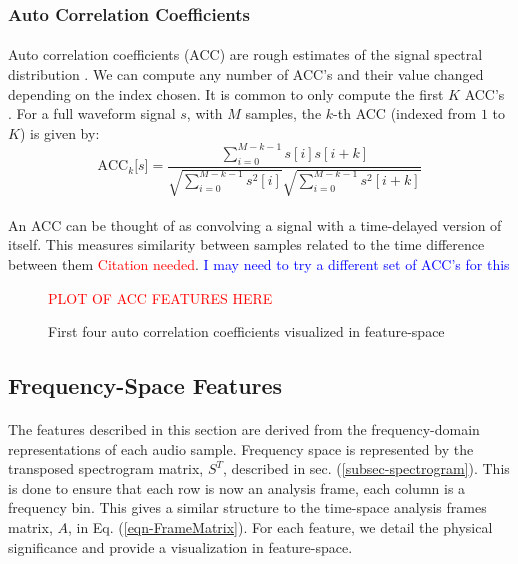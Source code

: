 \documentclass[12pt,letterpaper]{article}
\begin{document}
\subsubsection{Auto Correlation Coefficients}

\paragraph*{}Auto correlation coefficients (ACC) are rough estimates of the signal spectral distribution . We can compute any number of ACC's and their value changed depending on the index chosen. It is common to only compute the first $K$ ACC's \cite{Serizel}. For a full waveform signal $s$, with $M$ samples, the $k$-th ACC (indexed from $1$ to $K$) is given by:
\begin{equation}
\label{eqn-FeatureACC}
\text{ACC}_k\big[ s \big] = 
\frac{\sum_{i=0}^{M-k-1}s[i]s[i+k]} {\sqrt{\sum_{i=0}^{M-k-1}s^2[i]} \sqrt{\sum_{i=0}^{M-k-1}s^2[i+k]}}
\end{equation}

\paragraph*{}An ACC can be thought of as convolving a signal with a time-delayed version of itself. This measures similarity between samples related to the time difference between them \textcolor{red}{Citation needed}. \textcolor{blue}{I may need to try a different set of ACC's for this}

\begin{figure}[H]
\label{fig-FeatureACC}
\begin{center}
\textcolor{red}{PLOT OF ACC FEATURES HERE}
\end{center}
\caption{First four auto correlation coefficients visualized in feature-space}
\end{figure}


\newpage

\subsection{Frequency-Space Features}
\label{subsec-frequency}

\paragraph*{}The features described in this section are derived from the frequency-domain representations of each audio sample. Frequency space is represented by the transposed spectrogram matrix, $S^T$, described in sec. (\ref{subsec-spectrogram}). This is done to ensure that each  row is now an analysis frame, each column is a frequency bin. This gives a similar structure to the time-space analysis frames matrix, $A$, in Eq. (\ref{eqn-FrameMatrix}).
For each feature, we detail the physical significance and provide a visualization in feature-space.
\end{document}
